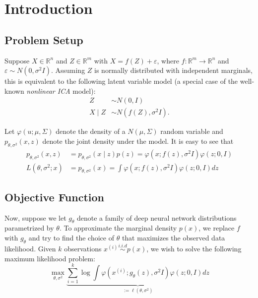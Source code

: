 \section{Introduction}
\subsection{Problem Setup}
Suppose $X \in \mathbb{R}^{n}$ and $Z \in \mathbb{R}^{m}$ with $X=f(Z)+\varepsilon$, where $f: \mathbb{R}^{m} \rightarrow \mathbb{R}^{n}$ and $\varepsilon \sim N\left(0, \sigma^{2} I\right)$. Assuming $Z$ is normally distributed with independent marginals, this is equivalent to the following latent variable model (a special case of the well-known \textit{nonlinear ICA} model):
\begin{equation*}
\begin{aligned}
Z & \sim N\left(0, I\right) \\
X \mid Z & \sim N\left(f(Z), \sigma^{2} I\right) .
\end{aligned}
\end{equation*}

Let $\varphi(u ; \mu, \Sigma)$ denote the density of a $N(\mu, \Sigma)$ random variable and $p_{\theta, \sigma^{2}}(x, z)$ denote the joint density under the model. It is easy to see that
\begin{equation*}
\begin{aligned}
p_{\theta, \sigma^{2}}\left(x, z\right) &=p_{\theta, \sigma^{2}} \left(x \mid z\right) p(z)=\varphi\left(x ; f(z), \sigma^{2} I\right) \varphi(z ; 0, I) \\
L \left(\theta, \sigma^{2} ; x\right) &= p_{\theta, \sigma^{2}}\left(x\right) =\int \varphi\left(x ; f(z), \sigma^{2} I\right) \varphi(z ; 0, I) dz
\end{aligned}
\end{equation*}

\subsection{Objective Function}
Now, suppose we let $g_{\theta}$ denote a family of deep neural network distributions parametrized by $\theta$. To approximate the marginal density $p(x)$, we replace $f$ with $g_{\theta}$ and try to find the choice of $\theta$ that maximizes the observed data likelihood. Given $k$ observations $x^{(i)} \stackrel{i.i.d}{\sim} p(x)$, we wish to solve the following maximum likelihood problem:
\begin{equation*}
\max_{\theta, \sigma^{2}} \underbrace{\sum_{i=1}^{k} \log \int \varphi\left(x^{(i)} ; g_{\theta}(z), \sigma^{2} I\right) \varphi(z ; 0, I) dz}_{:=\ell(\theta, \sigma^{2})}
\end{equation*}
